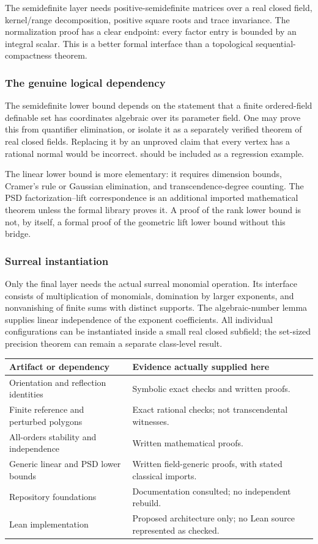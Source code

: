 \documentclass[11pt,a4paper]{article}
\numberwithin{equation}{section}
\theoremstyle{plain}
\begin{document}
The semidefinite layer needs positive-semidefinite matrices over a real
closed field, kernel/range decomposition, positive square roots and
trace invariance. The normalization proof has a clear endpoint: every
factor entry is bounded by an integral scalar. This is a better formal
interface than a topological sequential-compactness theorem.

\subsubsection{The genuine logical dependency}
The semidefinite lower bound depends on the statement that a finite
ordered-field definable set has coordinates algebraic over its parameter
field. One may prove this from quantifier elimination, or isolate it as
a separately verified theorem of real closed fields. Replacing it by
an unproved claim that every vertex has a rational normal would be
incorrect.  should be included as a regression example.

The linear lower bound is more elementary: it requires dimension bounds,
Cramer's rule or Gaussian elimination, and transcendence-degree counting.
The PSD factorization--lift correspondence is an additional imported
mathematical theorem unless the formal library proves it. A proof of the
rank lower bound is not, by itself, a formal proof of the geometric lift
lower bound without this bridge.

\subsubsection{Surreal instantiation}
Only the final layer needs the actual surreal monomial operation.
Its interface consists of multiplication of monomials, domination by
larger exponents, and nonvanishing of finite sums with distinct supports.
The algebraic-number lemma supplies linear independence of the exponent
coefficients. All individual configurations can be instantiated inside
a small real closed subfield; the set-sized precision theorem can remain
a separate class-level result.

\begin{center}
\begin{tabular}{@{}p{}p{}@{}}
\toprule
Artifact or dependency & Evidence actually supplied here\\
\midrule
Orientation and reflection identities & Symbolic exact checks and written proofs.\\
Finite reference and perturbed polygons & Exact rational checks; not transcendental witnesses.\\
All-orders stability and independence & Written mathematical proofs.\\
Generic linear and PSD lower bounds & Written field-generic proofs, with stated classical imports.\\
Repository foundations & Documentation consulted; no independent rebuild.\\
Lean implementation & Proposed architecture only; no Lean source represented as checked.\\
\bottomrule
\end{tabular}
\end{center}
\end{document}
